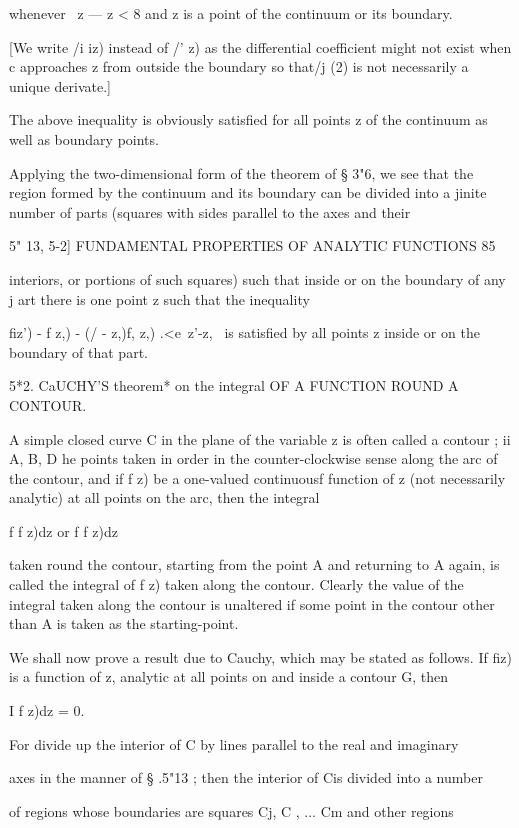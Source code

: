 whenever \ z — z < 8 and z is a point of the continuum or its
boundary.

[We write /i iz) instead of /' z) as the differential coefficient
might not exist when c approaches z from outside the boundary so
that/j (2) is not necessarily a unique derivate.]

The above inequality is obviously satisfied for all points z of the
continuum as well as boundary points.

Applying the two-dimensional form of the theorem of § 3"6, we see that
the region formed by the continuum and its boundary can be divided
into a jinite number of parts (squares with sides parallel to the axes
and their



5" 13, 5-2] FUNDAMENTAL PROPERTIES OF ANALYTIC FUNCTIONS 85

interiors, or portions of such squares) such that inside or on the
boundary of any j art there is one point z such that the inequality

fiz') - f z,) - (/ - z,)f, z,) .<e\ z'-z, \ is satisfied by all points
z inside or on the boundary of that part.

5*2. CaUCHY'S theorem* on the integral OF A FUNCTION ROUND A CONTOUR.

A simple closed curve C in the plane of the variable z is often called
a contour ; ii A, B, D he points taken in order in the
counter-clockwise sense along the arc of the contour, and if f z) be a
one-valued continuousf function of z (not necessarily analytic) at all
points on the arc, then the integral

f f z)dz or f f z)dz

taken round the contour, starting from the point A and returning to A
again, is called the integral of f z) taken along the contour. Clearly
the value of the integral taken along the contour is unaltered if some
point in the contour other than A is taken as the starting-point.

We shall now prove a result due to Cauchy, which may be stated as
follows. If fiz) is a function of z, analytic at all points on and
inside a contour G, then

I f z)dz = 0.

For divide up the interior of C by lines parallel to the real and
imaginary

axes in the manner of § .5"13 ; then the interior of Cis divided into
a number

of regions whose boundaries are squares Cj, C , ... Cm and other
regions

